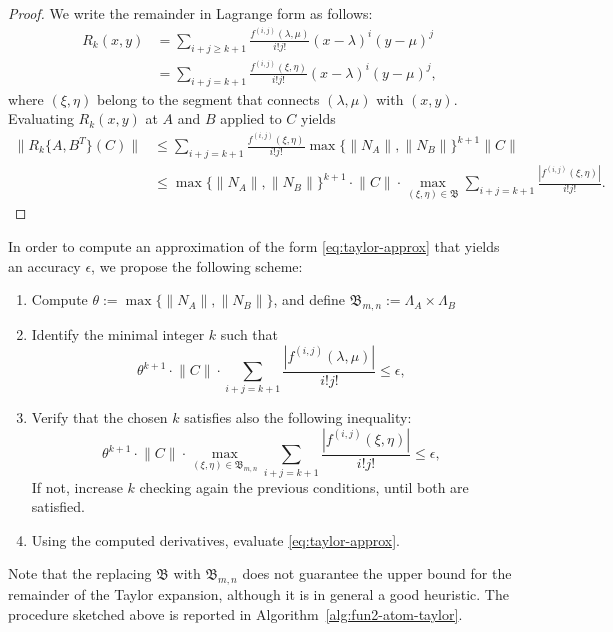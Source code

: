 \documentclass{siamart1116}
\newcommand{\norm}[1]{\lVert#1\rVert}
\begin{document}
\begin{proof}
    We write the remainder in Lagrange form as follows:
    \begin{align*}
      R_k(x,y) &= \sum_{i+j \ge k+1} \frac{f^{(i,j)}(\lambda, \mu)}{i!j!}
      (x - \lambda)^i (y - \mu)^j \\
      &= \sum_{i+j=k+1} \frac{f^{(i,j)}(\xi, \eta)}{i!j!}
      (x - \lambda)^i (y - \mu)^j, 
    \end{align*}
    where $(\xi, \eta)$ belong to the segment that
    connects $(\lambda, \mu)$ with $(x,y)$. Evaluating $R_k(x,y)$
    at $A$ and $B$ applied to $C$ yields
    \begin{align*}
      \norm{R_k\{A,B^T\}(C)} &\leq 
      \sum_{i+j=k+1} \frac{f^{(i,j)}(\xi, \eta)}{i!j!}
      \max \{ \norm{N_A}, \norm{N_B} \}^{k+1} \norm{C} \\
      &\leq \max \{ \norm{N_A},  \norm{N_B} \}^{k+1}
      \cdot \norm{C} \cdot 
      \max_{(\xi, \eta) \in \mathfrak B}
        \sum_{i+j=k+1} \frac{|f^{(i,j)}(\xi, \eta)|}{i!j!}.
    \end{align*}

\end{proof}
In order to compute an approximation of the form \eqref{eq:taylor-approx} that yields an accuracy $\epsilon$, we propose the following scheme:
\begin{enumerate}
    \item Compute $\theta :=\max\{\norm{N_A},\norm{N_B}\}$, and define $\mathfrak B_{m,n}:=\Lambda_A\times \Lambda_B$
    \item Identify the minimal integer $k$ such that
    $$
    \theta^{k+1}
      \cdot \norm{C} \cdot 
        \sum_{i+j=k+1} \frac{|f^{(i,j)}(\lambda, \mu)|}{i!j!}\leq \epsilon,
    $$
    \item Verify that the chosen $k$ satisfies 
    also the following inequality:
    $$
    \theta^{k+1}
      \cdot \norm{C} \cdot 
      \max_{(\xi, \eta) \in \mathfrak B_{m,n}}
        \sum_{i+j=k+1} \frac{|f^{(i,j)}(\xi, \eta)|}{i!j!}\leq \epsilon,
    $$
    If not, increase $k$ checking again the previous conditions,
    until both are satisfied.
    \item Using the computed derivatives, evaluate \eqref{eq:taylor-approx}.
\end{enumerate}
Note that the replacing $\mathfrak B$ with $\mathfrak B_{m,n}$ does not guarantee the upper bound for the remainder of the Taylor expansion, although it is in general a good heuristic.  
The  procedure sketched above is reported in 
Algorithm~\ref{alg:fun2-atom-taylor}.
\end{document}
